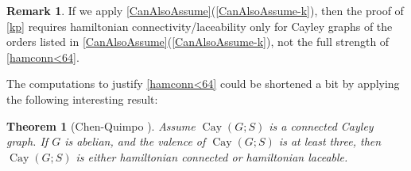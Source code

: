 \documentclass[]{amcjoucc}
\newcommand{\pref}[1]{(\ref{#1})}
\newcommand{\fullcref}[2]{\cref{#1}\pref{#1-#2}}
\theoremstyle{plain}
\newtheorem{thm}[equation]{Theorem}
\theoremstyle{definition}
\theoremstyle{definition}
\newtheorem{rem}[equation]{Remark}
\DeclareMathOperator{\Cay}{Cay}
\begin{document}
\begin{rem}
If we apply \fullcref{CanAlsoAssume}{k}, then the proof of \cref{kp} requires hamiltonian connectivity/laceability only for Cayley graphs of the orders listed in \fullcref{CanAlsoAssume}{k}, not the full strength of \cref{hamconn<64}.
\end{rem}

The computations to justify \cref{hamconn<64} could be shortened a bit by applying the following interesting result:

\begin{thm}[{}{Chen-Quimpo \cite{ChenQuimpo}}] \label{ChenQuimpo}
Assume $\Cay(G;S)$ is a connected Cayley graph. If $G$ is abelian, and the valence of\/ $\Cay(G;S)$ is at least three, then $\Cay(G;S)$ is either hamiltonian connected or hamiltonian laceable.
 \end{thm}
\end{document}
